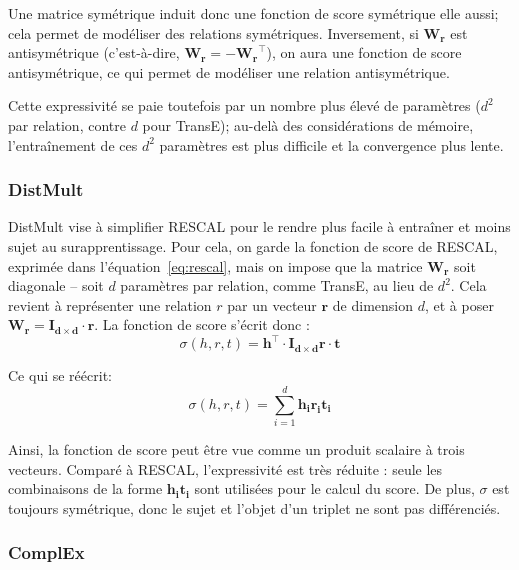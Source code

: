 Une matrice symétrique induit donc une fonction de score symétrique elle aussi; cela permet de modéliser des relations symétriques. Inversement, si $\mathbf{W_r}$ est antisymétrique (c'est-à-dire, $\mathbf{W_r} = -\mathbf{W_r}^\top$), on aura une fonction de score antisymétrique, ce qui permet de modéliser une relation antisymétrique.

Cette expressivité se paie toutefois par un nombre plus élevé de paramètres ($d^2$ par relation, contre $d$ pour TransE); au-delà des considérations de mémoire, l'entraînement de ces $d^2$ paramètres est plus difficile et la convergence plus lente.

\subsubsection{DistMult}

DistMult \cite{distmult} vise à simplifier RESCAL pour le rendre plus facile à entraîner et moins sujet au surapprentissage. Pour cela, on garde la fonction de score de RESCAL, exprimée dans l'équation~\ref{eq:rescal}, mais on impose que la matrice $\mathbf{W_r}$ soit diagonale – soit $d$ paramètres par relation, comme TransE, au lieu de $d^2$. Cela revient à représenter une relation $r$ par un vecteur $\mathbf{r}$ de dimension $d$, et à poser $\mathbf{W_r = I_{d\times d} \cdot r}$. La fonction de score s'écrit donc :
\begin{equation}
    \label{eq:distmult}
    \sigma(h, r, t) = \mathbf{h^\top \cdot I_{d\times d}r \cdot t}
\end{equation}

Ce qui se réécrit:
\begin{equation}
    \sigma(h, r, t) = \sum_{i=1}^{d} \mathbf{h_i r_i t_i}
\end{equation}

Ainsi, la fonction de score peut être vue comme un produit scalaire à trois vecteurs. Comparé à RESCAL, l'expressivité est très réduite : seule les combinaisons de la forme $\mathbf{h_i t_i}$ sont utilisées pour le calcul du score. De plus, $\sigma$ est toujours symétrique, donc le sujet et l'objet d'un triplet ne sont pas différenciés.

\subsubsection{ComplEx}
\label{subsec:complex}

